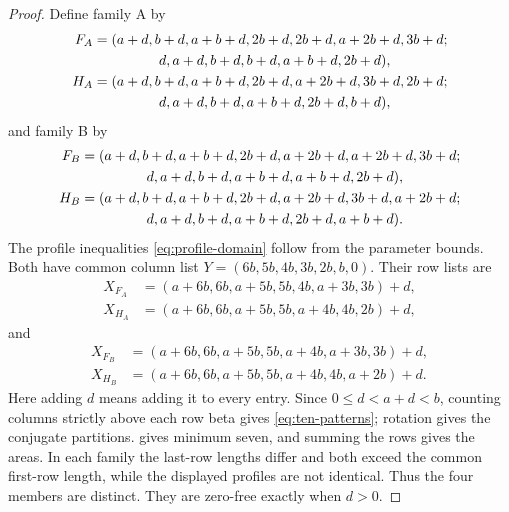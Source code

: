 \documentclass[11pt,a4paper]{amsart}
\numberwithin{equation}{section}
\theoremstyle{plain}
\theoremstyle{definition}
\begin{document}
\begin{proof}
Define family A by
\begin{equation}\label{eq:ten-family-a-profiles}
 \begin{aligned}
 F_A={}&(a+d,b+d,a+b+d,2b+d,2b+d,a+2b+d,3b+d;\\
      &\hspace{12mm}d,a+d,b+d,b+d,a+b+d,2b+d),\\
 H_A={}&(a+d,b+d,a+b+d,2b+d,a+2b+d,3b+d,2b+d;\\
      &\hspace{12mm}d,a+d,b+d,a+b+d,2b+d,b+d),
 \end{aligned}
\end{equation}
and family B by
\begin{equation}\label{eq:ten-profiles}
 \begin{aligned}
 F_B={}&(a+d,b+d,a+b+d,2b+d,a+2b+d,a+2b+d,3b+d;\\
      &\hspace{12mm}d,a+d,b+d,a+b+d,a+b+d,2b+d),\\
 H_B={}&(a+d,b+d,a+b+d,2b+d,a+2b+d,3b+d,a+2b+d;\\
      &\hspace{12mm}d,a+d,b+d,a+b+d,2b+d,a+b+d).
 \end{aligned}
\end{equation}
The profile inequalities \eqref{eq:profile-domain} follow from the
parameter bounds.  Both have common column list
\(Y=(6b,5b,4b,3b,2b,b,0)\).  Their row lists are
\begin{equation}\label{eq:ten-family-a-beta-lists}
 \begin{aligned}
 X_{F_A}&=(a+6b,6b,a+5b,5b,4b,a+3b,3b)+d,\\
 X_{H_A}&=(a+6b,6b,a+5b,5b,a+4b,4b,2b)+d,
 \end{aligned}
\end{equation}
and
\begin{equation}\label{eq:ten-beta-lists}
 \begin{aligned}
 X_{F_B}&=(a+6b,6b,a+5b,5b,a+4b,a+3b,3b)+d,\\
 X_{H_B}&=(a+6b,6b,a+5b,5b,a+4b,4b,a+2b)+d.
 \end{aligned}
\end{equation}
Here adding \(d\) means adding it to every entry.  Since
\(0\le d<a+d<b\), counting columns strictly above each row beta gives
\eqref{eq:ten-patterns}; rotation gives the conjugate partitions.
 gives minimum seven, and summing the
rows gives the areas.  In each family the last-row lengths differ and
both exceed the common first-row length, while the displayed profiles
are not identical.  Thus the four members are distinct.  They are
zero-free exactly when \(d>0\).


\end{proof}
\end{document}
